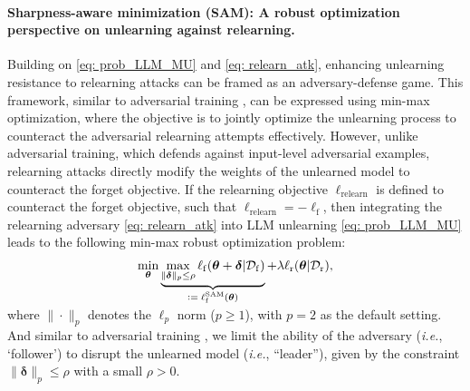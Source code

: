 \paragraph{Sharpness-aware minimization (SAM): A robust optimization perspective on unlearning against relearning.}
Building on \eqref{eq: prob_LLM_MU} and \eqref{eq: relearn_atk}, enhancing unlearning resistance to relearning attacks can be framed as an adversary-defense game. This framework, similar to adversarial training \citep{madry2018towards}, can be expressed using min-max optimization, where the objective is to jointly optimize the unlearning process to counteract the adversarial relearning attempts effectively.
However, unlike adversarial training, which defends against input-level adversarial examples, relearning attacks directly modify the weights of the unlearned model to counteract the forget objective. 
If the relearning objective $\ell_{\mathrm{relearn}}$ is defined to counteract the forget objective, such that $\ell_{\mathrm{relearn}} = -\ell_{\mathrm{f}}$,  then integrating the relearning adversary  \eqref{eq: relearn_atk} into LLM unlearning \eqref{eq: prob_LLM_MU} leads to the following min-max robust optimization problem:
\begin{align}
\begin{array}{l}
 \displaystyle \min_{\boldsymbol{\theta}}     \underbrace{ 
 \max_{\| \boldsymbol{\delta} \|_p \leq \rho } 
 \ell_{\mathrm{f}}(\boldsymbol{\theta} + \boldsymbol{\delta} | \mathcal{D}_\mathrm{f})
 }_\text{$\Def \ell^{\mathrm{SAM}}_{\mathrm{f}} (\btheta)$} 
 + \lambda     \ell_\mathrm{r}(  \boldsymbol{\theta} |\mathcal{D}_{\mathrm{r}} )   , 
 \vspace*{-2mm}
\end{array}
\label{eq: prob_LLM_MU_SAM}
\end{align}
where $\| \cdot \|_p$ denotes the $\ell_p$ norm ($p \geq 1$), with $p = 2$ as the default setting. And similar to adversarial training \citep{madry2018towards}, we limit the ability of the adversary (\textit{i.e.}, `follower') to disrupt the unlearned model (\textit{i.e.}, ``leader''), given by the constraint  $\| \boldsymbol{\delta} \|_p \leq \rho$ with a small $\rho > 0$.


